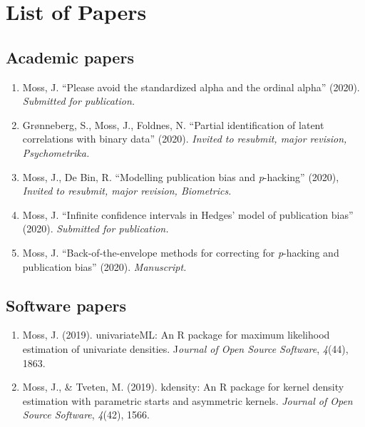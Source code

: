 \chapter{List of Papers}


\section*{Academic papers}
\begin{enumerate}

\item Moss, J. ``Please avoid the standardized alpha and the ordinal alpha''
(2020). \emph{Submitted for publication.}

\item Grønneberg, S., Moss, J., Foldnes, N. ``Partial identification of
latent correlations with binary data'' (2020). \emph{Invited to resubmit, major revision, Psychometrika.}

\item Moss, J., De Bin, R. ``Modelling publication bias and \emph{p}-hacking''
(2020), \emph{Invited to resubmit, major revision, Biometrics.}

\item Moss, J. ``Infinite confidence intervals in Hedges' model of publication
bias'' (2020). \emph{Submitted for publication.}

\item Moss, J. ``Back-of-the-envelope methods for correcting for \emph{p}-hacking
and publication bias'' (2020). \emph{Manuscript.}
\end{enumerate}

\section*{Software papers}
\begin{enumerate}
\item Moss, J. (2019). univariateML: An R package for maximum likelihood
estimation of univariate densities. J\emph{ournal of Open Source Software},
\emph{4}(44), 1863.
\item Moss, J., \& Tveten, M. (2019). kdensity: An R package for kernel
density estimation with parametric starts and asymmetric kernels.
\emph{Journal of Open Source Software}, \emph{4}(42), 1566.
\end{enumerate}
